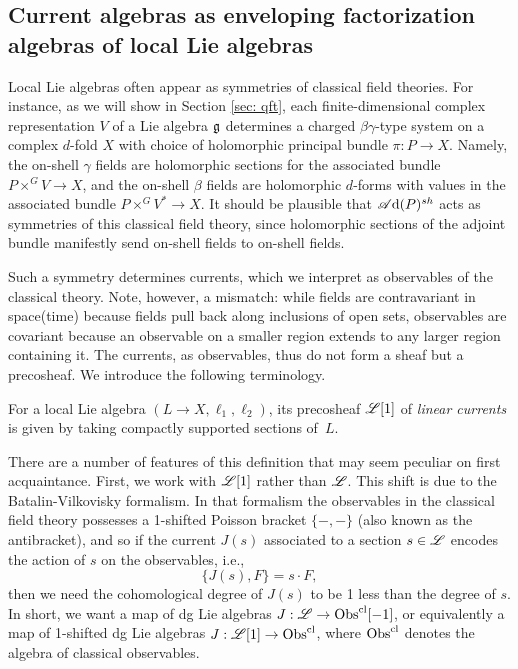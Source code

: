 \subsection{Current algebras as enveloping factorization algebras of local Lie algebras}
\label{sec: envelopes}

Local Lie algebras often appear as symmetries of classical field theories.
For instance, as we will show in Section \ref{sec: qft}, 
each finite-dimensional complex representation $V$ of a Lie algebra $\mathfrak g$
determines a charged $\beta\gamma$-type system on a complex $d$-fold $X$ with choice of holomorphic principal bundle $\pi: P \to X$.
Namely, the on-shell $\gamma$ fields are holomorphic sections for the associated bundle $P \times^G V \to X$, 
and the on-shell $\beta$ fields are holomorphic $d$-forms with values in the associated bundle $P \times^G V^* \to X$.
It should be plausible that $\mathscr A{\rm d}(P)^{sh}$ acts as symmetries of this classical field theory,
since holomorphic sections of the adjoint bundle manifestly send on-shell fields to on-shell fields.

Such a symmetry determines currents, which we interpret as observables of the classical theory.
Note, however, a mismatch: 
while fields are contravariant in space(time) because fields pull back along inclusions of open sets, 
observables are covariant because an observable on a smaller region extends to any larger region containing it.
The currents, as observables, thus do not form a sheaf but a precosheaf.
We introduce the following terminology.

\begin{dfn}
For a local Lie algebra $(L\to X, \ell_1,\ell_2)$, its precosheaf $\mathscr L[1]$ of {\em linear currents} is given by taking compactly supported sections of~$L$.
\end{dfn}

There are a number of features of this definition that may seem peculiar on first acquaintance.
First, we work with $\mathscr L[1]$ rather than $\mathscr L$.
This shift is due to the Batalin-Vilkovisky formalism. 
In that formalism the observables in the classical field theory possesses a 1-shifted Poisson bracket $\{-,-\}$ (also known as the antibracket), and so if the current $J(s)$ associated to a section $s \in \mathscr L$ encodes the action of $s$ on the observables, i.e.,
\[
\{J(s), F\} = s \cdot F,
\]
then we need the cohomological degree of $J(s)$ to be 1 less than the degree of $s$.
In short, we want a map of dg Lie algebras $J: \mathscr L \to {\rm Obs}^{\rm cl}[-1]$,
or equivalently a map of 1-shifted dg Lie algebras $J: \mathscr L[1] \to {\rm Obs}^{\rm cl}$,
where ${\rm Obs}^{\rm cl}$ denotes the algebra of classical observables.

